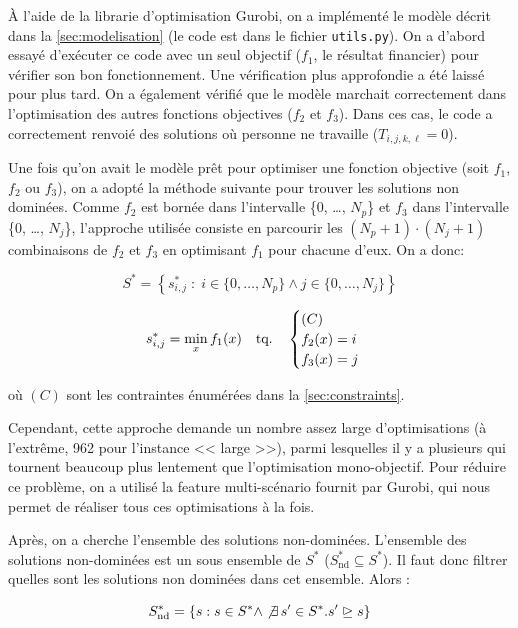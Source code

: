 \documentclass[12pt, a4paper, french, version=last, parskip=half, titlepage]{scrartcl}
\begin{document}
À l'aide de la librarie d'optimisation Gurobi, on a implémenté le modèle décrit dans la \cref{sec:modelisation} (le code est dans le fichier \texttt{utils.py}). On a d'abord essayé d'exécuter ce code avec un seul objectif ($f_1$, le résultat financier) pour vérifier son bon fonctionnement.  Une vérification plus approfondie a été laissé pour plus tard. On a également vérifié que le modèle marchait correctement dans l'optimisation des autres fonctions objectives ($f_2$ et $f_3$). Dans ces cas, le code a correctement renvoié des solutions où personne ne travaille ($T_{i,j,k,\ell} = 0$).

Une fois qu'on avait le modèle prêt pour optimiser une fonction objective (soit $f_1$, $f_2$ ou $f_3$), on a adopté la méthode suivante pour trouver les solutions non dominées. Comme $f_2$ est bornée dans l'intervalle \{0, \dots, $N_p$\} et $f_3$ dans l'intervalle \{0, \dots, $N_j$\}, l'approche utilisée consiste en parcourir les $(N_p+1)\cdot(N_j+1)$ combinaisons de $f_2$ et $f_3$ en optimisant $f_1$ pour chacune d'eux. On a donc:

\begin{equation*}
    S^{*} = \left\{s_{i,j}^{*} \;:\; i \in \{0,\dots,N_p\} \land j \in \{0,\dots, N_j\} \right\}
\end{equation*}

\begin{equation*}
    s^{*}_{i,j} = \min_x f_1(x) \qq{tq.} \begin{cases}(C) \\ f_2(x) = i \\ f_3(x) = j\end{cases}
\end{equation*}

où $(C)$ sont les contraintes énumérées dans la \cref{sec:constraints}.

Cependant, cette approche demande un nombre assez large d'optimisations (à l'extrême, 962 pour l'instance << large >>), parmi lesquelles il y a plusieurs qui tournent beaucoup plus lentement que l'optimisation mono-objectif. Pour réduire ce problème, on a utilisé la feature multi-scénario fournit par Gurobi, qui nous permet de réaliser tous ces optimisations à la fois.

Après, on a cherche l'ensemble des solutions non-dominées. L'ensemble des solutions non-dominées est un sous ensemble de $S^{*}$ ($S^*_{\mathrm{nd}} \subseteq S^{*}$). Il faut donc filtrer quelles sont les solutions non dominées dans cet ensemble. Alors :

\begin{equation*}
    S^*_{\mathrm{nd}} = \left\{s : s \in S^{*} \land \not\exists \, s' \in S^{*}. s' \trianglerighteq s \right\}
\end{equation*}
\end{document}

